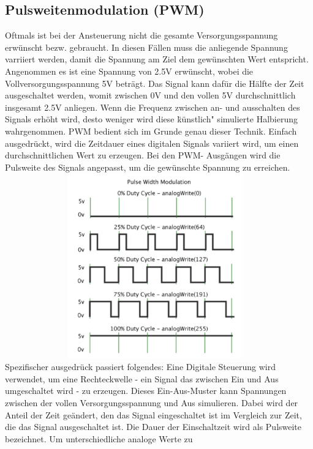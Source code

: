 \subsection{Pulsweitenmodulation (PWM)}\label{PWM}
Oftmals ist bei der Ansteuerung nicht die gesamte Versorgungsspannung erwünscht bezw. gebraucht. In diesen Fällen muss
die anliegende Spannung varriiert werden, damit die Spannung am Ziel dem gewünschten Wert entspricht.
Angenommen es ist eine Spannung von 2.5V erwünscht, wobei die Vollversorgungsspannung 5V beträgt. Das Signal kann
dafür die Hälfte der Zeit ausgeschaltet werden, womit zwischen 0V und den vollen 5V durchschnittlich insgesamt 2.5V
anliegen. Wenn die Frequenz zwischen an- und ausschalten des Signals erhöht wird, desto weniger wird diese \"künstlich"
simulierte Halbierung wahrgenommen. \newline
PWM bedient sich im Grunde genau dieser Technik.
Einfach ausgedrückt, wird die Zeitdauer eines digitalen Signals variiert wird, um einen
durchschnittlichen Wert zu erzeugen. Bei den PWM- Ausgängen wird die Pulsweite des Signals angepasst, um die gewünschte Spannung
zu erreichen. \newline
\includegraphics [width=13cm, height=8cm] {img/pulsweite} \newline \newline
Spezifischer ausgedrück passiert folgendes:
Eine Digitale Steuerung wird verwendet, um eine Rechteckwelle - ein Signal das zwischen Ein und Aus umgeschaltet wird
- zu erzeugen. Dieses Ein-Aus-Muster kann Spannungen zwischen der vollen Versorgungsspannung und Aus
simulieren.
Dabei wird der Anteil der Zeit geändert, den das Signal eingeschaltet ist im Vergleich zur Zeit, die das Signal
ausgeschaltet ist. Die Dauer der Einschaltzeit wird als Pulsweite bezeichnet. Um unterschiedliche analoge Werte zu
